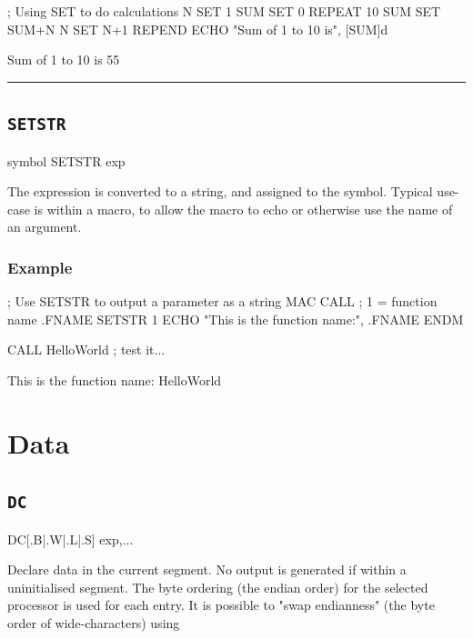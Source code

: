 \begin{code}
; Using SET to do calculations
N SET 1 
SUM SET 0
  REPEAT 10
SUM SET SUM+N
N SET N+1
  REPEND
  ECHO "Sum of 1 to 10 is", [SUM]d
\end{code}

\begin{outputx}
Sum of 1 to 10 is 55
\end{outputx}


\hrule
\subsection{\texttt{SETSTR}}
\label{pseudoop:setstr}

\begin{usage}
symbol SETSTR exp
\end{usage}

The expression is converted to a string, and assigned to the
symbol. Typical use-case is within a macro, to allow the
macro to echo or otherwise use the name of an argument.

\subsubsection{Example}

\begin{code}[caption=Use of SETSTR to Display Function Name]
; Use SETSTR to output a parameter as a string
    MAC CALL    ; {1} = function name
.FNAME  SETSTR {1}
        ECHO "This is the function name:", .FNAME
    ENDM
    
    CALL HelloWorld        ; test it...
\end{code}

\begin{outputx}
This is the function name: HelloWorld
\end{outputx}



\section{Data}
\subsection{\texttt{DC}}
\label{pseudoop:dc}

\begin{usage}
   DC[{.B|.W|.L|.S}] exp,...
\end{usage}
\label{changelog:20200915endian}
Declare data in the current segment.  No output is generated if within a uninitialised  segment. The byte ordering (the endian order) for the selected processor is used for each entry. It is possible to "swap endianness" (the byte order of wide-characters) using 

